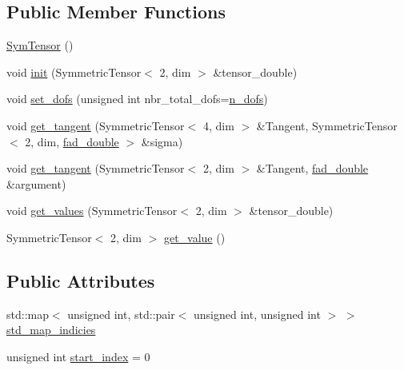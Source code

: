 \subsection*{Public Member Functions}
\begin{DoxyCompactItemize}
\item 
\hyperlink{classSacado__Wrapper_1_1SymTensor_a4e7ec32177eb891e3f1a32a16bcd59f5}{Sym\+Tensor} ()
\item 
void \hyperlink{classSacado__Wrapper_1_1SymTensor_acbad579d5ead9e96ff46aa15d9b5aef4}{init} (Symmetric\+Tensor$<$ 2, dim $>$ \&tensor\+\_\+double)
\item 
void \hyperlink{classSacado__Wrapper_1_1SymTensor_aa9e0fcc9d4e0a4120bedb8ef9b8d7ecb}{set\+\_\+dofs} (unsigned int nbr\+\_\+total\+\_\+dofs=\hyperlink{classSacado__Wrapper_1_1SymTensor_a733bc4b029ff8d067b48e7ce3ee7606b}{n\+\_\+dofs})
\item 
void \hyperlink{classSacado__Wrapper_1_1SymTensor_ab97427c3b5cab279e58607cf431ab262}{get\+\_\+tangent} (Symmetric\+Tensor$<$ 4, dim $>$ \&Tangent, Symmetric\+Tensor$<$ 2, dim, \hyperlink{Sacado-auxiliary__functions_8h_a868b94676739e612d9c95940e70892a9}{fad\+\_\+double} $>$ \&sigma)
\item 
void \hyperlink{classSacado__Wrapper_1_1SymTensor_ac0ab9caa8c54102e24c4d007f820873b}{get\+\_\+tangent} (Symmetric\+Tensor$<$ 2, dim $>$ \&Tangent, \hyperlink{Sacado-auxiliary__functions_8h_a868b94676739e612d9c95940e70892a9}{fad\+\_\+double} \&argument)
\item 
void \hyperlink{classSacado__Wrapper_1_1SymTensor_afbab1ce0f846f026f5bd8b449180b5e9}{get\+\_\+values} (Symmetric\+Tensor$<$ 2, dim $>$ \&tensor\+\_\+double)
\item 
Symmetric\+Tensor$<$ 2, dim $>$ \hyperlink{classSacado__Wrapper_1_1SymTensor_ade8f6c8cb25c2b6e2baac06ef638c293}{get\+\_\+value} ()
\end{DoxyCompactItemize}
\subsection*{Public Attributes}
\begin{DoxyCompactItemize}
\item 
std\+::map$<$ unsigned int, std\+::pair$<$ unsigned int, unsigned int $>$ $>$ \hyperlink{classSacado__Wrapper_1_1SymTensor_ae3b1c56cde3fc5c7805b618ef3d9de75}{std\+\_\+map\+\_\+indicies}
\item 
unsigned int \hyperlink{classSacado__Wrapper_1_1SymTensor_afe921e6044e4110fcfc848c52844d650}{start\+\_\+index} = 0
\end{DoxyCompactItemize}
